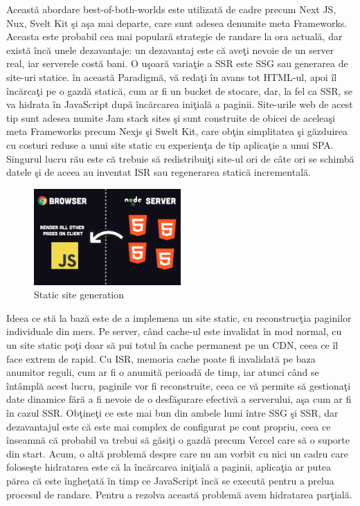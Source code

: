 \documentclass[12pt, a4paper]{report}
\begin{document}
Aceast\u a abordare best-of-both-worlds este utilizat\u a de cadre precum Next JS, Nux, Svelt Kit \c si a\c sa mai departe, care sunt adesea denumite meta Frameworks. Aceasta este probabil cea mai popular\u a strategie de randare la ora actual\u a, dar exist\u a \^ inc\u a unele dezavantaje: un dezavantaj este c\u a ave\c ti nevoie de un server real, iar serverele cost\u a bani. O u\c soar\u a varia\c tie a SSR este SSG sau generarea de site-uri statice. \^ in aceast\u a Paradigm\u a, v\u a reda\c ti \^ in avans tot HTML-ul, apoi \^ il \^ inc\u arca\c ti pe o gazd\u a static\u a, cum ar fi un bucket de stocare, dar, la fel ca SSR, se va hidrata \^ in JavaScript dup\u a \^ inc\u arcarea ini\c tial\u a a paginii. Site-urile web de acest tip sunt adesea numite Jam stack sites \c si sunt construite de obicei de acelea\c si meta Frameworks precum Nexjs \c si Swelt Kit, care ob\c tin simplitatea \c si g\u azduirea cu costuri reduse a unui site static cu experien\c ta de tip aplica\c tie a unui SPA. Singurul lucru r\u au este c\u a trebuie s\u a redistribui\c ti site-ul ori de c\^ ate ori se schimb\u a datele \c si de aceea au inventat ISR sau regenerarea static\u a incremental\u a.

\begin{figure}[htbp]
	\centering
	\includegraphics[width=0.5\textwidth]{41.png}
	\caption{Static site generation}
	\label{fig:ssg}
\end{figure}

Ideea ce st\u a la baz\u a este de a implemena un site static, cu reconstruc\c tia paginilor individuale din mers. Pe server, c\^ and cache-ul este invalidat \^ in mod normal, cu un site static po\c ti doar s\u a pui totul \^ in cache permanent pe un CDN, ceea ce \^ il face extrem de rapid. Cu ISR, memoria cache poate fi invalidat\u a pe baza anumitor reguli, cum ar fi o anumit\u a perioad\u a de timp, iar atunci c\^ and se \^ int\^ ampl\u a acest lucru, paginile vor fi reconstruite, ceea ce v\u a permite s\u a gestiona\c ti date dinamice f\u ar\u a a fi nevoie de o desf\u a\c surare efectiv\u a a serverului, a\c sa cum ar fi \^ in cazul SSR. Ob\c tine\c ti ce este mai bun din ambele lumi \^ intre SSG \c si SSR, dar dezavantajul este c\u a este mai complex de configurat pe cont propriu, ceea ce \^ inseamn\u a c\u a probabil va trebui s\u a g\u asi\c ti o gazd\u a precum Vercel care s\u a o suporte din start. Acum, o alt\u a problem\u a despre care nu am vorbit cu nici un cadru care folose\c ste hidratarea este c\u a la \^ inc\u arcarea ini\c tial\u a a paginii, aplica\c tia ar putea p\u area c\u a este \^ inghe\c tat\u a \^ in timp ce JavaScript \^ inc\u a se execut\u a pentru a prelua procesul de randare. Pentru a rezolva aceast\u a problem\u a avem hidratarea par\c tial\u a. \cite{fireship}
\end{document}
